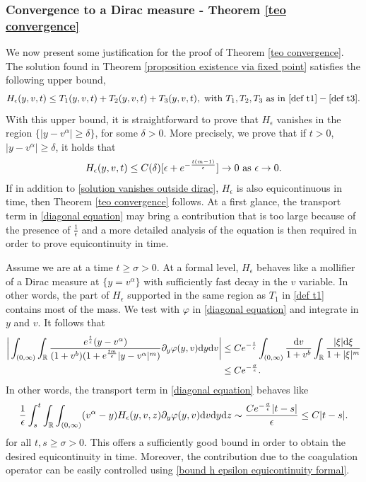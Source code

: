 \documentclass[11pt]{article}
\numberwithin{equation}{section}
\newcommand{\der}{\textup{d}}
\begin{document}
  \subsubsection*{Convergence to a Dirac measure - Theorem \ref{teo convergence}}
  We now present some justification for the proof of Theorem \ref{teo convergence}. The solution found in Theorem 
\ref{proposition existence via fixed point} satisfies the following upper bound,
  \begin{align}\label{bound h epsilon equicontinuity formal}
      H_{\epsilon}(y,v,t)\leq T_{1}(y,v,t)+T_{2}(y,v,t)+T_{3}(y,v,t), \textup{ with } T_{1},T_{2},T_{3} \textup{ as in } \eqref{def t1}-\eqref{def t3}.
  \end{align}
With this upper bound, it is straightforward to prove that $H_{\epsilon}$ vanishes in the region $\{|y-v^{\alpha}|\geq \delta\}$, for some $\delta>0$. More precisely, we prove that if $t>0$, $|y-v^{\alpha}|\geq \delta$, it holds that
\begin{align}\label{solution vanishes outside dirac}
 H_{\epsilon}(y,v,t)\leq C(\delta)[\epsilon+e^{-\frac{t(m-1)}{\epsilon}}]\rightarrow 0 \textup{ as } \epsilon\rightarrow 0.
\end{align}
If in addition to \eqref{solution vanishes outside dirac}, $H_{\epsilon}$ is also equicontinuous in time, then Theorem \ref{teo convergence} follows. At a first glance, the transport term in \eqref{diagonal equation} may bring a contribution that is too large because of the presence of $\frac{1}{\epsilon}$ and a more detailed analysis of the equation is then required in order to prove equicontinuity in time.

Assume we are at a time $t\geq\sigma>0$. At a formal level, $H_{\epsilon}$ behaves like a mollifier of a Dirac measure at $\{y=v^{\alpha}\}$ with sufficiently fast decay in the $v$ variable. In other words, the part of $H_{\epsilon}$ supported in the same region as $T_{1}$  in \eqref{def t1} contains most of the mass. We test with $\varphi$ in \eqref{diagonal equation}  and integrate in $y$ and $v$. It follows that
\begin{align*}
    \bigg|\int_{(0,\infty)}\int_{\mathbb{R}}\frac{e^{\frac{t}{\epsilon}}(y-v^{\alpha})}{(1+v^{b})(1+e^{\frac{tm}{\epsilon}}|y-v^{\alpha}|^{m})}\partial_{y}\varphi(y,v) \der y\der v\bigg|&\leq Ce^{-\frac{t}{\epsilon}} \int_{(0,\infty)}\frac{\der v}{1+v^{b}}\int_{\mathbb{R}}\frac{|\xi|\der \xi}{1+|\xi|^{m}}\\
    &\leq Ce^{-\frac{\sigma}{\epsilon}}.
    \end{align*}
In other words, the transport term in \eqref{diagonal equation} behaves like
\begin{align*}
    \frac{1}{\epsilon}\int_{s}^{t}\int_{\mathbb{R}}\int_{(0,\infty)}(v^{\alpha}-y)H_{\epsilon}(y,v,z)\partial_{y}\varphi(y,v)\der v \der y \der z\sim \frac{Ce^{-\frac{\sigma}{\epsilon}}|t-s|}{\epsilon}\leq C|t-s|.
\end{align*}
for all $t,s\geq\sigma>0$. This offers a sufficiently good bound in order to obtain the desired equicontinuity in time.  Moreover, the contribution due to the coagulation operator can be easily controlled using \eqref{bound h epsilon equicontinuity formal}. 
\end{document}
